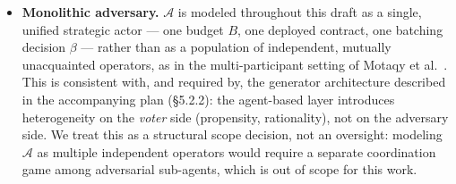 \documentclass[journal,onecolumn,11pt]{IEEEtran}
\begin{document}
\begin{itemize}
\item \textbf{Monolithic adversary.} $\mathcal{A}$ is modeled throughout this
draft as a single, unified strategic actor --- one budget $B$, one
deployed contract, one batching decision $\beta$ --- rather than as a
population of independent, mutually unacquainted operators, as in the
multi-participant setting of Motaqy et al.~\cite{motaqy2021bet}. This is
consistent with, and required by, the generator architecture described
in the accompanying plan (\S5.2.2): the agent-based layer introduces
heterogeneity on the \emph{voter} side (propensity, rationality), not on
the adversary side. We treat this as a structural scope decision, not an
oversight: modeling $\mathcal{A}$ as multiple independent operators would
require a separate coordination game among adversarial sub-agents, which
is out of scope for this work.



\end{itemize}




\end{document}
